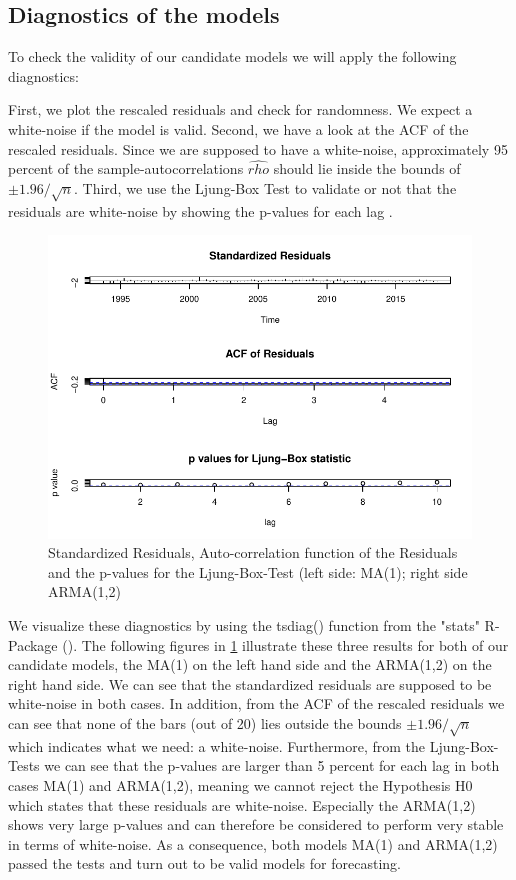 \documentclass[11pt,a4paper]{article}
\begin{document}
\subsection{Diagnostics of the models}
To check the validity of our candidate models we will apply the following diagnostics:

First, we plot the rescaled residuals and check for randomness.
We expect a white-noise if the model is valid.
Second, we have a look at the ACF of the rescaled residuals.
Since we are supposed to have a white-noise, approximately 95 percent of the sample-autocorrelations $\hat{rho}$ should lie inside the bounds of $\pm 1.96/\sqrt{n}$.
Third, we use the Ljung-Box Test \citep{LjungBox78} to validate or not that the residuals are white-noise by showing the p-values for each lag \cite[Lecture~11]{chevalier18}.

\begin{figure}
    \centering
    \includegraphics[width=1\textwidth]{ts_diag_ma_1}
    \caption{Standardized Residuals, Auto-correlation function of the Residuals and the p-values for the Ljung-Box-Test (left side: MA(1); right side ARMA(1,2)}
    \label{fig:ts_diag_ma_1}
\end{figure}


We visualize these diagnostics by using the tsdiag() function from the "stats" R-Package (\citet{R_stats}).
The following figures in \cref{fig:ts_diag_ma_1} illustrate these three results for both of our candidate models, the MA(1) on the left hand side and the ARMA(1,2) on the right hand side.
We can see that the standardized residuals are supposed to be white-noise in both cases.
In addition, from the ACF of the rescaled residuals we can see that none of the bars (out of 20) lies outside the bounds $\pm 1.96 / \sqrt{n}$ which indicates what we need: a white-noise.
Furthermore, from the Ljung-Box-Tests we can see that the p-values are larger than 5 percent for each lag in both cases MA(1) and ARMA(1,2), meaning we cannot reject the Hypothesis H0 which states that these residuals are white-noise.
Especially the ARMA(1,2) shows very large p-values and can therefore be considered to perform very stable in terms of white-noise.
As a consequence, both models MA(1) and ARMA(1,2) passed the tests and turn out to be valid models for forecasting.
\end{document}
